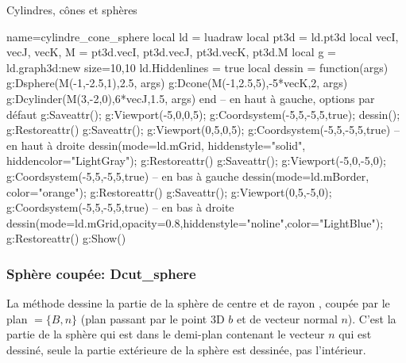 \begin{demo}{Cylindres, cônes et sphères}
\begin{luadraw}{name=cylindre_cone_sphere}
local ld = luadraw
local pt3d = ld.pt3d
local vecI, vecJ, vecK, M = pt3d.vecI, pt3d.vecJ, pt3d.vecK, pt3d.M
local g = ld.graph3d:new{ size={10,10} }
ld.Hiddenlines = true
local dessin = function(args)
    g:Dsphere(M(-1,-2.5,1),2.5, args)
    g:Dcone(M(-1,2.5,5),-5*vecK,2, args)
    g:Dcylinder(M(3,-2,0),6*vecJ,1.5, args)
end
-- en haut à gauche, options par défaut
g:Saveattr(); g:Viewport(-5,0,0,5); g:Coordsystem(-5,5,-5,5,true); dessin(); g:Restoreattr()
g:Saveattr(); g:Viewport(0,5,0,5); g:Coordsystem(-5,5,-5,5,true) -- en haut à droite
dessin({mode=ld.mGrid, hiddenstyle="solid", hiddencolor="LightGray"}); g:Restoreattr()
g:Saveattr(); g:Viewport(-5,0,-5,0); g:Coordsystem(-5,5,-5,5,true) -- en bas à gauche
dessin({mode=ld.mBorder, color="orange"}); g:Restoreattr()
g:Saveattr(); g:Viewport(0,5,-5,0); g:Coordsystem(-5,5,-5,5,true) -- en bas à droite
dessin({mode=ld.mGrid,opacity=0.8,hiddenstyle="noline",color="LightBlue"}); g:Restoreattr()
g:Show()
\end{luadraw}
\end{demo}

\subsubsection{Sphère coupée: Dcut\_sphere}

La méthode  dessine la partie de la sphère de centre  et de rayon , coupée par le plan $=\{B,n\}$ (plan passant par le point 3D $b$ et de vecteur normal $n$). C'est la partie de la sphère qui est dans le demi-plan contenant le vecteur $n$ qui est dessiné, seule la partie extérieure de la sphère est dessinée, pas l'intérieur.

